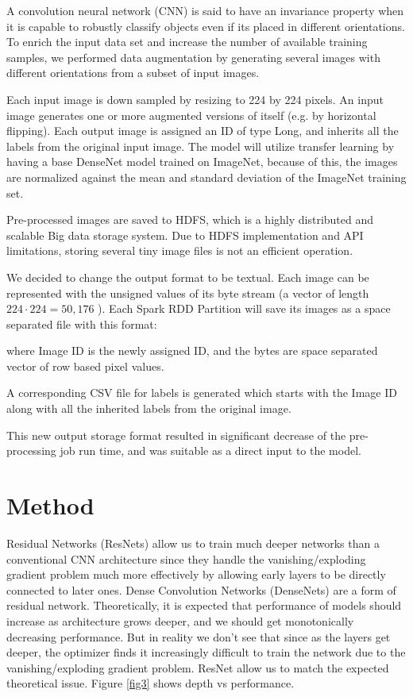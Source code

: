 \documentclass{amia}
\begin{document}
A convolution neural network (CNN) is said to have an invariance property when it is capable to robustly classify objects even if its placed in different orientations. To enrich the input data set and increase the number of available training samples, we performed data augmentation by generating several images with different orientations from a subset of input images.

Each input image is down sampled by resizing to 224 by 224 pixels. An input image generates one or more augmented versions of itself (e.g. by horizontal flipping). Each output image is assigned an ID of type Long, and inherits all the labels from the original input image. The model will utilize transfer learning by having a base DenseNet model trained on ImageNet, because of this, the images are normalized against the mean and standard deviation of the ImageNet training set.

Pre-processed images are saved to HDFS, which is a highly distributed and scalable Big data storage system. Due to HDFS implementation and API limitations, storing several tiny image files is not an efficient operation.

We decided to change the output format to be textual. Each image can be represented with the unsigned values of its byte stream (a vector of length $224\cdot224=50,176$ ). Each Spark RDD Partition will save its images as a space separated file with this format:


where Image ID is the newly assigned ID, and the bytes are space separated vector of row based pixel values.

A corresponding CSV file for labels is generated which starts with the Image ID along with all the inherited labels from the original image.

This new output storage format resulted in significant decrease of the pre-processing job run time, and was suitable as a direct input to the model.

\section*{Method}
Residual Networks (ResNets) allow us to train much deeper networks than a conventional CNN architecture since they handle the vanishing/exploding gradient problem much more effectively by allowing early layers to be directly connected to later ones. Dense Convolution Networks (DenseNets) are a form of residual network. Theoretically, it is expected that performance of models should increase as architecture grows deeper, and we should get monotonically decreasing performance. But in reality we don't see that since as the layers get deeper, the optimizer finds it increasingly difficult to train the network due to the vanishing/exploding gradient problem. ResNet allow us to match the expected theoretical issue. Figure \ref{fig3} shows depth vs performance.
\end{document}
